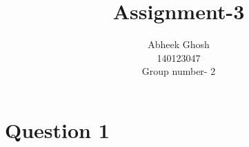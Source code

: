\documentclass{article}
\begin{document}
	\title{\textbf{Assignment-3}}
	\author{Abheek Ghosh \\ 
		140123047 \\
		Group number- 2}
	
	\maketitle
	
	\section{Question 1}
	
\end{document}
